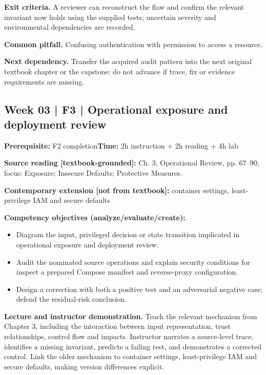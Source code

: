 \documentclass[10pt,letterpaper]{article}
\begin{document}
\textbf{Exit criteria.} A reviewer can reconstruct the flaw and confirm the relevant invariant now holds using the supplied tests; uncertain severity and environmental dependencies are recorded.

\textbf{Common pitfall.} Confusing authentication with permission to access a resource.

\textbf{Next dependency.} Transfer the acquired audit pattern into the next original textbook chapter or the capstone; do not advance if trace, fix or evidence requirements are missing.

\subsection{Week 03 | F3 | Operational exposure and deployment review}
\textbf{Prerequisite:} F2 completion\hfill\textbf{Time:} 2h instruction + 2h reading + 4h lab

\textbf{Source reading [textbook-grounded]:} Ch. 3, Operational Review, pp. 67--90; focus: Exposure; Insecure Defaults; Protective Measures.

\textbf{Contemporary extension [not from textbook]:} container settings, least-privilege IAM and secure defaults

\textbf{Competency objectives (analyze/evaluate/create):}
\begin{itemize}[leftmargin=*,itemsep=2pt]
\item Diagram the input, privileged decision or state transition implicated in operational exposure and deployment review.
\item Audit the nominated source operations and explain security conditions for inspect a prepared Compose manifest and reverse-proxy configuration.
\item Design a correction with both a positive test and an adversarial negative case; defend the residual-risk conclusion.
\end{itemize}
\textbf{Lecture and instructor demonstration.} Teach the relevant mechanism from Chapter 3, including the interaction between input representation, trust relationships, control flow and impacts. Instructor narrates a source-level trace, identifies a missing invariant, predicts a failing test, and demonstrates a corrected control. Link the older mechanism to container settings, least-privilege IAM and secure defaults, making version differences explicit.
\end{document}
